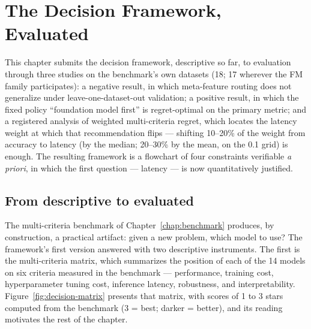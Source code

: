 \chapter{The Decision Framework, Evaluated}
\label{chap:framework}

This chapter submits the decision framework, descriptive so far, to
evaluation through three studies on the benchmark's own datasets
(18; 17 wherever the FM family participates):
a negative result, in which meta-feature routing does not generalize
under leave-one-dataset-out validation; a positive result, in which
the fixed policy ``foundation model first'' is regret-optimal on the
primary metric; and a registered analysis of weighted
multi-criteria regret, which locates the latency weight at which that
recommendation flips --- shifting 10--20\% of the weight from
accuracy to latency (by the median; 20--30\% by the mean, on the
0.1 grid) is enough. The resulting framework is a flowchart
of four constraints verifiable \emph{a priori}, in which the first
question --- latency --- is now quantitatively justified.

\section{From descriptive to evaluated}
\label{sec:descritivo-validado}

The multi-criteria benchmark of Chapter~\ref{chap:benchmark}
produces, by construction, a practical artifact: given a new problem,
which model to use? The framework's first version answered with two
descriptive instruments. The first is the multi-criteria matrix,
which summarizes the position of each of the 14 models on six
criteria measured in the benchmark --- performance, training cost,
hyperparameter tuning cost, inference latency, robustness, and
interpretability. Figure~\ref{fig:decision-matrix} presents that
matrix, with scores of 1 to 3 stars computed from the benchmark (3 =
best; darker = better), and its reading motivates the rest of the
chapter.

